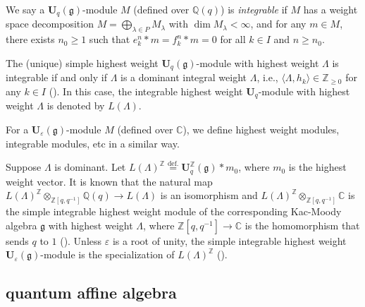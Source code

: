 \documentclass[12pt]{amsart}
\def\Bbb{\mathbb}
\def\frak{\mathfrak}
\theoremstyle{definition}
\theoremstyle{remark}
\numberwithin{equation}{subsection}
\newcommand{\defeq}{\overset{\operatorname{\scriptstyle def.}}{=}}
\newcommand{\C}{{\Bbb C}}
\newcommand{\Z}{{\Bbb Z}}
\newcommand{\Q}{{\Bbb Q}}
\newcommand{\Uq}{{\mathbf U}_q(\mathfrak g)} %
\newcommand{\Un}{{\mathbf U}_q}
\newcommand{\Ui}{{\mathbf U}^{\Z}_q(\mathfrak g)}
\newcommand{\Ue}{{\mathbf U}_{\varepsilon}(\mathfrak g)}
\newcommand{\hiw}{{L}} %
\begin{document}
We say a $\Uq$-module $M$ (defined over $\Q(q)$) is {\it integrable\/}
if $M$ has a weight space decomposition $M = \bigoplus_{\lambda\in P}
M_\lambda$ with $\dim M_\lambda < \infty$,
%
and for any $m\in M$, there exists $n_0\ge 1$ such that $e_{k}^{n}
\ast m = f_{k}^{n}\ast m = 0$ for all $k\in I$ and $n\ge n_0$.

The (unique) simple highest weight $\Uq$-module with highest
weight $\Lambda$ is integrable if and only if
$\Lambda$ is a dominant integral weight $\Lambda$, i.e.,
$\langle\Lambda, h_k\rangle\in \Z_{\ge 0}$ for any $k\in I$
(\cite[3.5.6, 3.5.8]{Lu-Book}).
In this case, the integrable highest
weight $\Un$-module with highest weight $\Lambda$ 
is denoted by $\hiw(\Lambda)$.

For a $\Ue$-module $M$ (defined over $\C$), we define highest weight
modules, integrable modules, etc in a similar way.

Suppose $\Lambda$ is dominant. 
Let $\hiw(\Lambda)^\Z \defeq \Ui\ast m_0$, where $m_0$ is the highest
weight vector.
%
It is known that the natural map
$\hiw(\Lambda)^\Z\otimes_{\Z[q,q^{-1}]}\Q(q)\to \hiw(\Lambda)$
is an isomorphism and 
$\hiw(\Lambda)^\Z\otimes_{\Z[q,q^{-1}]}\C$ is the simple
integrable highest weight module of the corresponding Kac-Moody
algebra $\mathfrak g$ with highest weight $\Lambda$, where
$\Z[q,q^{-1}]\to \C$ is the homomorphism that sends $q$ to $1$
(\cite[Chapter~14 and 33.1.3]{Lu-Book}).
%
Unless $\varepsilon$ is a root of unity, the simple integrable highest
weight $\Ue$-module is the specialization of $\hiw(\Lambda)^\Z$
(\cite[10.1.14, 10.1.15]{CP}).

\subsection{quantum affine algebra}\label{subsec:quantum_affine}

\end{document}

